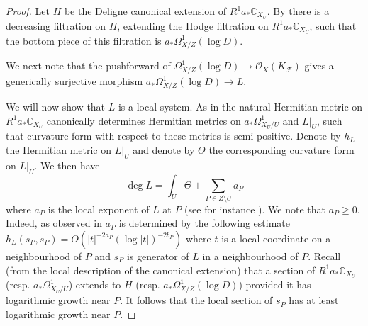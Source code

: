 \documentclass[12pt]{amsart}
\begin{document}
\begin{proof}
Let $H$ be the Deligne canonical extension of 
$R^1a_*\mathbb C_{X_U}$.
By \cite[Corollary, pg. 130]{MR756849} there is a decreasing filtration on $H$, extending the Hodge filtration on $R^1a_*\mathbb C_{X_U}$, such that the bottom piece of this filtration is $a_*\Omega^1_{X/Z}(\log D)$.

We next note that 
the pushforward of $\Omega^1_{X/Z}(\log D) \to \mathcal O_X(K_{\mathcal F})$ gives a generically surjective morphism $a_*\Omega^1_{X/Z}(\log D) \to L$.  

We will now show that $L$ is a local system.
As in \cite[Proof of Lemma]{MR510945} the natural Hermitian metric on $R^1a_*\mathbb C_{X_U}$ canonically determines Hermitian metrics on  $a_*\Omega^1_{X_U/U}$ and $L|_U$, such that curvature form with respect to these metrics is semi-positive.  Denote by $h_L$ the Hermitian metric on $L|_U$ and denote by $\Theta$ the corresponding curvature form 
on $L|_U$.
We then have \[\deg L = \int_{U} \Theta+\sum_{P \in Z \setminus U} a_P\]
where $a_P$ is the local exponent of $L$ at $P$ (see for instance \cite[Lemma 21]{kawamata81}).
We note that $a_P \ge  0$.  Indeed, as observed in \cite[Paragraph before Lemma 21]{kawamata81}
$a_P$ is determined by the following estimate $h_L(s_P, s_P) = O(|t|^{-2a_P}(\log |t|)^{-2b_P})$
where $t$ is a local coordinate on a neighbourhood of $P$ and $s_P$ is generator of $L$ in a neighbourhood of $P$.  Recall (from the local description of the canonical extension) that a section of
 $R^1a_*\mathbb C_{X_U}$ (resp. $a_*\Omega^1_{X_U/U}$) extends to $H$ (resp. $a_*\Omega^1_{X/Z}(\log D)$) provided it has logarithmic growth near $P$.  It follows that 
the local section of $s_P$ has at least logarithmic growth near $P$.



\end{proof}
\end{document}
